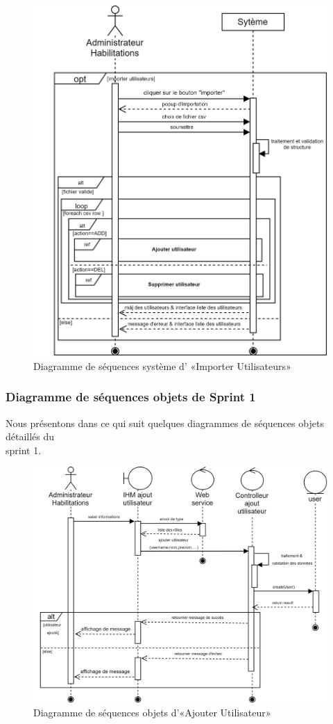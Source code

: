 \begin{figure}[H]
	\centering
	\includegraphics[width=0.65\linewidth]{img/conception/sequences/import}
	\caption[Diagramme de séquences système d’ «Importer Utilisateur»]{Diagramme de séquences système d' «Importer Utilisateurs»}
	\label{fig:import}
\end{figure}

\subsubsection{Diagramme de séquences objets de Sprint 1}
Nous présentons dans ce qui suit quelques diagrammes de séquences objets détaillés du \\sprint 1.
\newpage
{}
\begin{figure}[H]
	\centering
	\includegraphics[width=0.75\linewidth]{img/conception/sequences/add-user-obj}
	\caption[Diagramme de séquences objets d’«Ajouter Utilisateur»]{Diagramme de séquences objets d’«Ajouter Utilisateur»}
	\label{fig:add-user-obj}
\end{figure}


